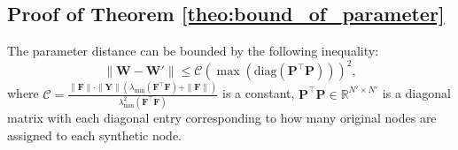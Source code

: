 

    

\subsection{Proof of Theorem \ref{theo:bound_of_parameter}}
\label{app:proof_bound_of_parameter}
\begin{theorem-nonumber}
    The parameter distance can be bounded by the following inequality:
    \begin{equation}
        \| \mathbf{W} - \mathbf{W}' \| \leq \mathcal{C}(\max (\text{diag}(\mathbf{\mathbf{P}^\top\mathbf{P}})))^2,
    \end{equation}
    where $\mathcal{C}=\frac{\|\mathbf{F} \| \cdot \| \mathbf{Y}\|({\lambda_{\min}(\mathbf{F}^\top\mathbf{F})}+\|\mathbf{F} \|)}{{\lambda^2_{\min}(\mathbf{F}^\top\mathbf{F})}}$ is a constant, $\mathbf{P}^\top\mathbf{P} \in \mathbb{R}^{N' \times N'}$ is a diagonal matrix with each diagonal entry corresponding to how many original nodes are assigned to each synthetic node. 
\end{theorem-nonumber}

